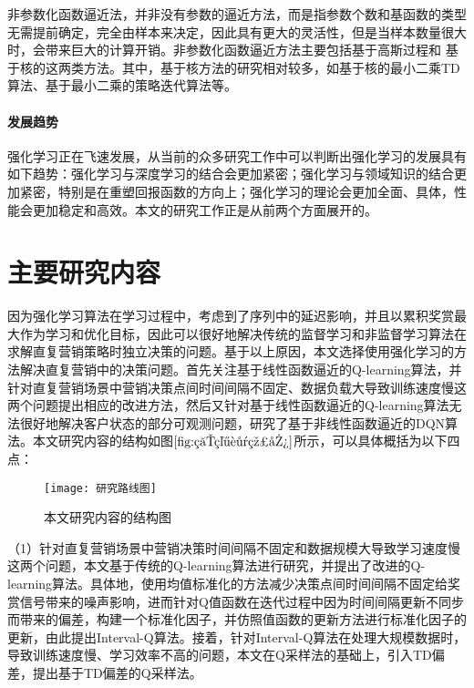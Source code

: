 
非参数化函数逼近法，并非没有参数的逼近方法，而是指参数个数和基函数的类型无需提前确定，完全由样本来决定，因此具有更大的灵活性，但是当样本数量很大时，会带来巨大的计算开销。非参数化函数逼近方法主要包括基于高斯过程和
基于核的这两类方法。其中，基于核方法的研究相对较多，如基于核的最小二乘TD算法\citep{xu2005kernel}、基于最小二乘的策略迭代算法\citep{xu2007kernel}等。

\paragraph{发展趋势}
强化学习正在飞速发展，从当前的众多研究工作中可以判断出强化学习的发展具有如下趋势：强化学习与深度学习的结合会更加紧密；强化学习与领域知识的结合更加紧密，特别是在重塑回报函数的方向上；强化学习的理论会更加全面、具体，性能会更加稳定和高效。本文的研究工作正是从前两个方面展开的。

\section{主要研究内容}
因为强化学习算法在学习过程中，考虑到了序列中的延迟影响，并且以累积奖赏最大作为学习和优化目标，因此可以很好地解决传统的监督学习和非监督学习算法在求解直复营销策略时独立决策的问题。基于以上原因，本文选择使用强化学习的方法解决直复营销中的决策问题。首先关注基于线性函数逼近的Q-learning算法，并针对直复营销场景中营销决策点间时间间隔不固定、数据负载大导致训练速度慢这两个问题提出相应的改进方法，然后又针对基于线性函数逼近的Q-learning算法无法很好地解决客户状态的部分可观测问题，研究了基于非线性函数逼近的DQN算法。本文研究内容的结构如图$\ref{fig:研究路线图}$所示，可以具体概括为以下四点：

\begin{figure}[htbp]
\centering
\texttt{[image: 研究路线图]}
\caption{本文研究内容的结构图}
\label{fig:研究路线图}
\end{figure}

（1）针对直复营销场景中营销决策时间间隔不固定和数据规模大导致学习速度慢这两个问题，本文基于传统的Q-learning算法进行研究，并提出了改进的Q-learning算法。具体地，使用均值标准化的方法减少决策点间时间间隔不固定给奖赏信号带来的噪声影响，进而针对Q值函数在迭代过程中因为时间间隔更新不同步而带来的偏差，构建一个标准化因子，并仿照值函数的更新方法进行标准化因子的更新，由此提出Interval-Q算法。接着，针对Interval-Q算法在处理大规模数据时，导致训练速度慢、学习效率不高的问题，本文在Q采样法的基础上，引入TD偏差，提出基于TD偏差的Q采样法。

